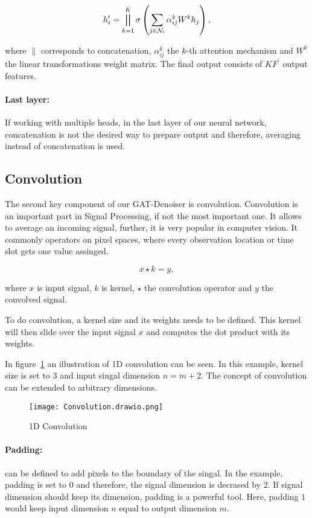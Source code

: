 \begin{equation}
  h_i^{\prime} = \bigparallel^K_{k=1} \sigma \left(\sum_{j \in \mathcal{N}_i} \alpha_{ij}^k W^k h_j \right),  
\end{equation}

where $\parallel$ corresponds to concatenation, $\alpha_{ij}^k$ the $k$-th attention mechanism and $W^k$ the linear
transformations weight matrix. The final output consists of $KF^{\prime}$ output features.

\paragraph{Last layer:}
If working with multiple heads, in the last layer of our neural network, concatenation is not the desired 
way to prepare output and therefore, averaging instead of concatenation is used.

\subsection{Convolution}
The second key component of our GAT-Denoiser is convolution.
Convolution is an important part in Signal Processing, if not the most important one.
It allows to average an incoming signal, further, it is very popular in computer vision.
It commonly operators on pixel spaces, where every observation location or time slot gets one value assinged.

\begin{equation}
  x \star k = y,
\end{equation}

where $x$ is input signal, $k$ is kernel, $\star$ the convolution operator and $y$ the convolved signal.


To do convolution, a kernel size and its weights needs to be defined. 
This kernel will then slide over the input signal $x$ and computes the dot product with its weights.

In figure~\ref{fig:1d-convolution} an illustration of 1D convolution can be seen. In this example,
kernel size is set to 3 and input singal dimension $n = m + 2$. The concept of convolution can be
extended to arbitrary dimensions.

\begin{figure}[h]
  \centering
  \label{fig:1d-convolution}
  \texttt{[image: Convolution.drawio.png]}
  \caption{1D Convolution}
\end{figure}

\paragraph{Padding:} 
can be defined to add pixels to the boundary of the singal.
In the example, padding is set to $0$ and therefore, the signal dimension is decrased by 2.
If signal dimension should keep its dimension, padding is a powerful tool. Here, padding $1$
would keep input dimension $n$ equal to output dimension $m$.


